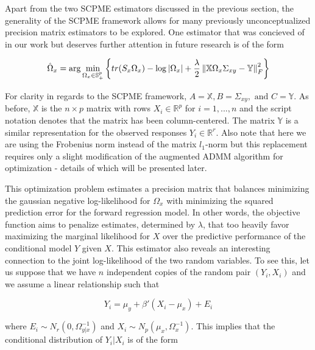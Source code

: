 \documentclass[11pt,]{report}
\theoremstyle{definition}
\theoremstyle{definition}
\theoremstyle{definition}
\theoremstyle{remark}
\begin{document}
Apart from the two SCPME estimators discussed in the previous section, the generality of the SCPME framework allows for many previously unconceptualized precision matrix estimators to be explored. One estimator that was concieved of in our work but deserves further attention in future research is of the form

\begin{equation}
\hat{\Omega}_{x} = \arg\min_{\Omega_{x} \in \mathbb{S}_{+}^{p}}\left\{ tr(S_{x}\Omega_{x}) - \log\left| \Omega_{x} \right| + \frac{\lambda}{2}\left\| \mathbb{X}\Omega_{x} \Sigma_{xy} - \mathbb{Y} \right\|_{F}^{2} \right\}
\label{eq:penregression}\notag
\end{equation}

For clarity in regards to the SCPME framework, \(A = \mathbb{X}, B = \Sigma_{xy}, \mbox{ and } C = \mathbb{Y}\). As before, \(\mathbb{X}\) is the \(n \times p\) matrix with rows \(X_{i} \in \mathbb{R}^{p}\) for \(i = 1,..., n\) and the script notation denotes that the matrix has been column-centered. The matrix \(\mathbb{Y}\) is a similar representation for the observed responses \(Y_{i} \in \mathbb{R}^{r}\). Also note that here we are using the Frobenius norm instead of the matrix \(l_{1}\)-norm but this replacement requires only a slight modification of the augmented ADMM algorithm for optimization - details of which will be presented later.

This optimization problem estimates a precision matrix that balances minimizing the gaussian negative log-likelihood for \(\Omega_{x}\) with minimizing the squared prediction error for the forward regression model. In other words, the objective function aims to penalize estimates, determined by \(\lambda\), that too heavily favor maximizing the marginal likelihood for \(X\) over the predictive performance of the conditional model \(Y\) given \(X\). This estimator also reveals an interesting connection to the joint log-likelihood of the two random variables. To see this, let us suppose that we have \(n\) independent copies of the random pair \((Y_{i}, X_{i})\) and we assume a linear relationship such that

\begin{equation}
Y_{i} = \mu_{y} + \beta'\left(X_{i} - \mu_{x}\right) + E_{i}
\end{equation}

where \(E_{i} \sim N_{r}\left( 0, \Omega_{y | x}^{-1} \right)\) and \(X_{i} \sim N_{p}\left( \mu_{x}, \Omega_{x}^{-1} \right)\). This implies that the conditional distribution of \(Y_{i}|X_{i}\) is of the form
\end{document}
